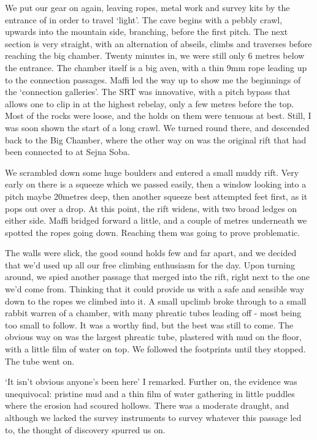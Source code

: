 We put our gear on again, leaving ropes, metal work and survey kits by the entrance of  in order to travel ‘light’. The cave begins with a pebbly crawl, upwards into the mountain side, branching, before the first pitch. The next section is very straight, with an alternation of abseils, climbs and traverses before reaching the big chamber. Twenty minutes in, we were still only 6 metres below the entrance. The chamber itself is a big aven, with a thin 9mm rope leading up to the connection passages. Maffi led the way up to show me the beginnings of the ‘connection galleries’. The SRT was innovative, with a pitch bypass that allows one to clip in at the highest rebelay, only a few metres before the top. Most of the rocks were loose, and the holds on them were tenuous at best. Still, I was soon shown the start of a long crawl. We turned round there, and descended back to the Big Chamber, where the other way on was the original  rift that had been connected to  at Sejna Soba. 

We scrambled down some huge boulders and entered a small muddy rift. Very early on there is a squeeze which we passed easily, then a window looking into a pitch maybe 20metres deep, then another squeeze best attempted feet first, as it pops out over a drop. At this point, the rift widens, with two broad ledges on either side. Maffi bridged forward a little, and a couple of metres underneath we spotted the ropes going down. Reaching them was going to prove problematic. 

The walls were slick, the good sound holds few and far apart, and we decided that we’d used up all our free climbing enthusiasm for the day. Upon turning around, we spied another passage that merged into the rift, right next to the one we’d come from. Thinking that it could provide us with a safe and sensible way down to the ropes we climbed into it. 
A small upclimb broke through to a small rabbit warren of a chamber, with many phreatic tubes leading off - most being too small to follow. It was a worthy find, but the best was still to come. The obvious way on was the largest phreatic tube, plastered with mud on the floor, with a little film of water on top. We followed the footprints until they stopped. The tube went on.

‘It isn’t obvious anyone’s been here’ I remarked. Further on, the evidence was unequivocal: pristine mud and a thin film of water gathering in little puddles where the erosion had scoured hollows. There was a moderate draught, and although we lacked the survey instruments to survey whatever this passage led to, the thought of discovery spurred us on. 

